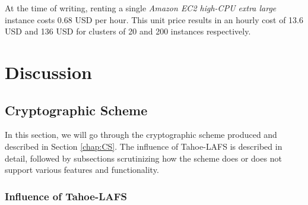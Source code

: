 \documentclass[pdftex,english,10pt,b5paper,twoside]{book}
\begin{document}
At the time of writing, renting a single \emph{Amazon EC2 high-CPU extra large}
instance costs 0.68 USD per hour. This unit price results in an hourly cost of
13.6 USD and 136 USD for clusters of 20 and 200 instances respectively. 

\chapter{Discussion}
\label{ch:discussion}





\section{Cryptographic Scheme}

In this section, we will go through the cryptographic scheme produced and
described in Section \ref{chap:CS}. The influence of Tahoe-\ac{LAFS} is
described in detail, followed by subsections scrutinizing how the scheme does
or does not support various features and functionality.

\subsection{Influence of Tahoe-LAFS}
\end{document}
